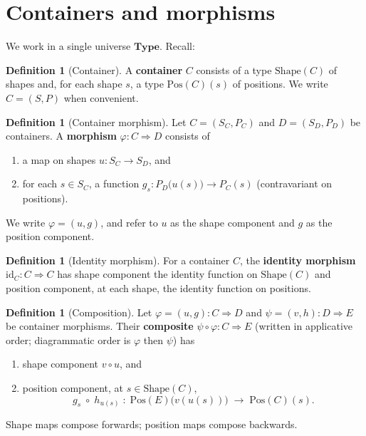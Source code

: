 \documentclass[11pt,a4paper]{article}
\theoremstyle{plain}
\theoremstyle{definition}
\newtheorem{definition}[theorem]{Definition}
\newcommand{\Shape}{\mathrm{Shape}}
\newcommand{\Pos}{\mathrm{Pos}}
\newcommand{\Type}{\mathbf{Type}}
\newcommand{\id}{\mathrm{id}}
\begin{document}
\section{Containers and morphisms}

We work in a single universe $\Type$. Recall:

\begin{definition}[Container]\label{def:container}
A \textbf{container} $C$ consists of a type $\Shape(C)$ of shapes and, for each
shape $s$, a type $\Pos(C)(s)$ of positions. We write $C=(S,P)$ when convenient.
\end{definition}

\begin{definition}[Container morphism]\label{def:morphism}
Let $C=(S_C,P_C)$ and $D=(S_D,P_D)$ be containers. A \textbf{morphism}
$\varphi:C\Rightarrow D$ consists of
\begin{enumerate}
  \item a map on shapes $u:S_C\to S_D$, and
  \item for each $s\in S_C$, a function
        $g_s:P_D\bigl(u(s)\bigr)\to P_C(s)$
        (contravariant on positions).
\end{enumerate}
We write $\varphi=(u,g)$, and refer to $u$ as the shape component and $g$ as
the position component.
\end{definition}

\begin{definition}[Identity morphism]\label{def:id}
For a container $C$, the \textbf{identity morphism} $\id_C:C\Rightarrow C$ has
shape component the identity function on $\Shape(C)$ and position component,
at each shape, the identity function on positions.
\end{definition}

\begin{definition}[Composition]\label{def:comp}
Let $\varphi=(u,g):C\Rightarrow D$ and $\psi=(v,h):D\Rightarrow E$ be
container morphisms. Their \textbf{composite}
$\psi\circ\varphi:C\Rightarrow E$ (written in applicative order; diagrammatic
order is $\varphi$ then $\psi$) has
\begin{enumerate}
  \item shape component $v\circ u$, and
  \item position component, at $s\in\Shape(C)$,
        \[
          g_s \;\circ\; h_{u(s)}
          \;:\;
          \Pos(E)\bigl(v(u(s))\bigr)
          \;\longrightarrow\;
          \Pos(C)(s).
        \]
\end{enumerate}
Shape maps compose forwards; position maps compose backwards.
\end{definition}
\end{document}
